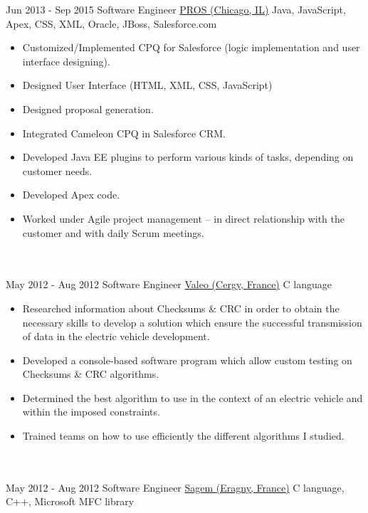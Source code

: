 \documentclass[letterpaper]{template} %
\begin{document}
\begin{twenty}
	\twentyitem
    	{Jun 2013 - Sep 2015}
		{}
        {Software Engineer}
        {\href{https://pros.com/}{PROS (Chicago, IL)}}
        {Java, JavaScript, Apex, CSS, XML, Oracle, JBoss, Salesforce.com}
        {\begin{itemize}
            \item Customized/Implemented CPQ for Salesforce (logic implementation and user interface designing).
            \item Designed User Interface (HTML, XML, CSS, JavaScript)
            \item Designed proposal generation. 
            \item Integrated Cameleon CPQ in Salesforce CRM.
            \item Developed Java EE plugins to perform various kinds of tasks, depending on customer needs.
            \item Developed Apex code.
            \item Worked under Agile project management – in direct relationship with the customer and with daily Scrum meetings.
        \end{itemize}}
    \\\divider\\
    \twentyitem
        {May 2012 - Aug 2012}
        {}
        {Software Engineer}
        {\href{https://www.valeo.com/en/}{Valeo (Cergy, France)}}
        {C language}
        {\begin{itemize}
            \item Researched information about Checksums \& CRC in order to obtain the necessary skills to develop a solution which ensure the successful transmission of data in the electric vehicle development.
            \item Developed a console-based software program which allow custom testing on Checksums \& CRC algorithms.
            \item Determined the best algorithm to use in the context of an electric vehicle and within the imposed constraints.
            \item Trained teams on how to use efficiently the different algorithms I studied.
        \end{itemize}}
    \\\divider\\
    \twentyitem
   		{May 2012 - Aug 2012}
		{}
        {Software Engineer}
        {\href{https://www.safran-group.com/}{Sagem (Eragny, France)}}
        {C language, C++, Microsoft MFC library}

\end{twenty}
\end{document}
